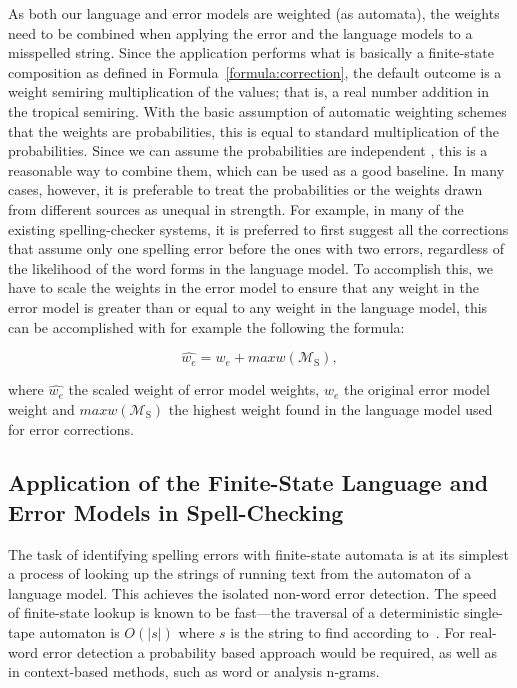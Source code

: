 \documentclass[a4paper,12pt]{article}
\begin{document}
As both our language and error models are weighted (as automata), the
weights need to be combined when applying the error and the language models to
a misspelled string. Since the application performs what is basically a
finite-state composition as defined in Formula~\ref{formula:correction}, the
default outcome is a weight semiring multiplication of the values; that is, a
real number addition in the tropical semiring. With the basic assumption of
automatic weighting schemes that the weights are probabilities, this is equal
to standard multiplication of the probabilities. Since we can assume the
probabilities are independent \cite[]{church1991probability}, this is a
reasonable way to combine them, which can be used as a good baseline. In many
cases, however, it is preferable to treat the probabilities or the weights
drawn from different sources as unequal in strength. For example, in many of the
existing spelling-checker systems, it is preferred to first suggest all the
corrections that assume only one spelling error before the ones with two
errors, regardless of the likelihood of the word forms in the language model.
To accomplish this, we have to scale the weights in the error model to ensure
that any weight in the error model is greater than or equal to any weight in
the language model, this can be accomplished with for example the following
the formula:

\begin{equation}
    \hat{w_e} = w_e + maxw(\mathcal{M}_\mathrm{S}),
\end{equation}

where $\hat{w_e}$ the scaled weight of error model weights, $w_e$ the original
error model weight and $maxw(\mathcal{M}_\mathrm{S})$ the highest weight found in
the language model used for error corrections.

\subsection{Application of the Finite-State Language and Error Models in
Spell-Checking}

The task of identifying spelling errors with finite-state automata is at its
simplest a process of looking up the strings of running text from the automaton
of a language model. This achieves the isolated non-word error detection. The
speed of finite-state lookup is known to be fast---the traversal of a
deterministic single-tape automaton is $O(|s|)$ where $s$ is the string to find
according to~\cite{aho2007compilers}. For real-word error detection a
probability based approach would be required, as well as in context-based
methods, such as word or analysis n-grams.
\end{document}
